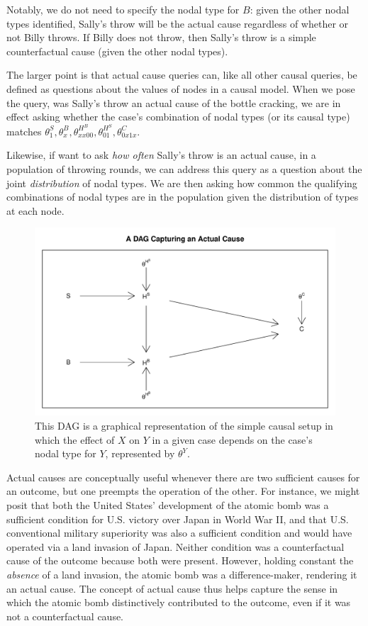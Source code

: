 \documentclass[
  12pt,
]{book}
\begin{document}
Notably, we do not need to specify the nodal type for \(B\): given the other nodal types identified, Sally's throw will be the actual cause regardless of whether or not Billy throws. If Billy does not throw, then Sally's throw is a simple counterfactual cause (given the other nodal types).

The larger point is that actual cause queries can, like all other causal queries, be defined as questions about the values of nodes in a causal model. When we pose the query, was Sally's throw an actual cause of the bottle cracking, we are in effect asking whether the case's combination of nodal types (or its causal type) matches \(\theta^S_1, \theta^B_x, \theta^{H^B}_{xx00}, \theta^{H^S}_{01}, \theta^C_{0x1x}\).

Likewise, if want to ask \emph{how often} Sally's throw is an actual cause, in a population of throwing rounds, we can address this query as a question about the joint \emph{distribution} of nodal types. We are then asking how common the qualifying combinations of nodal types are in the population given the distribution of types at each node.

\begin{figure}

{\centering \includegraphics[width=0.6\linewidth]{ii_files/figure-latex/actualquery-1} 

}

\caption{\label{fig:actualquery} This DAG is a graphical representation of the simple causal setup in which the effect of $X$ on $Y$ in a given case depends on the case's nodal type for $Y$, represented by $\theta^Y$.}\label{fig:actualquery}
\end{figure}

Actual causes are conceptually useful whenever there are two sufficient causes for an outcome, but one preempts the operation of the other. For instance, we might posit that both the United States' development of the atomic bomb was a sufficient condition for U.S. victory over Japan in World War II, and that U.S. conventional military superiority was also a sufficient condition and would have operated via a land invasion of Japan. Neither condition was a counterfactual cause of the outcome because both were present. However, holding constant the \emph{absence} of a land invasion, the atomic bomb was a difference-maker, rendering it an actual cause. The concept of actual cause thus helps capture the sense in which the atomic bomb distinctively contributed to the outcome, even if it was not a counterfactual cause.
\end{document}
